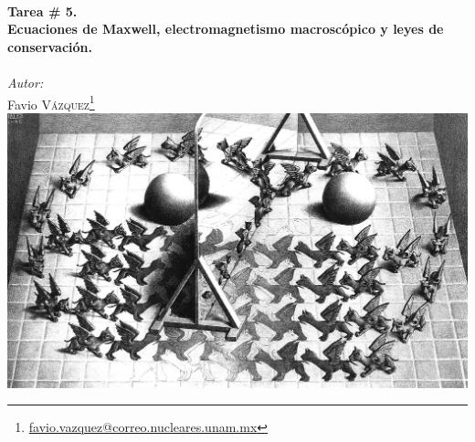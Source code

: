 \documentclass[a4paper,11pt]{article}
\numberwithin{equation}{section}
\begin{document}
\begin{titlepage}

\HRule \\[0.1cm]
{ \huge \bfseries Tarea \# 5. \\ Ecuaciones de Maxwell, 
electromagnetismo macroscópico y leyes de conservación.}\\ %
\HRule \\[0.1cm]
 
\setcounter{footnote}{0}
\center
\large
\emph{Autor:} \\ %
\Large Favio \textsc{Vázquez}\footnote[1]{\href{mailto:favio.vazquez@correo.nucleares.unam.mx}{favio.vazquez@correo.nucleares.unam.mx}}
\\[0.7cm]

\includegraphics[scale=1.55]{escherEspejo2D}


\vfill %

\end{titlepage}

\end{document}
